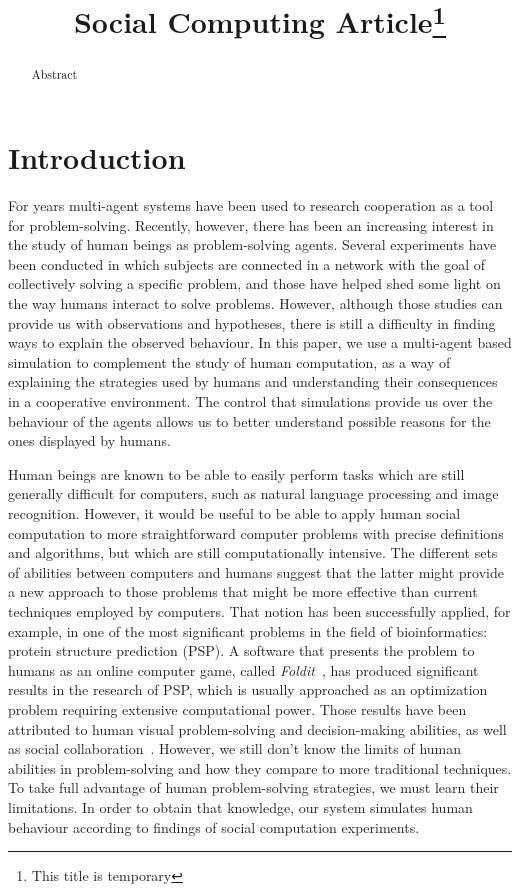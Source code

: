\documentclass[letterpaper]{article}
\title{Social Computing Article\thanks{This title is temporary}}
\begin{document}
\maketitle

\begin{abstract}
  Abstract
\end{abstract}

\section{Introduction}

For years multi-agent systems have been used to research cooperation as a tool for problem-solving. Recently, however, there has been an increasing interest in the study of human beings as problem-solving agents. Several experiments have been conducted in which subjects are connected in a network with the goal of collectively solving a specific problem, and those have helped shed some light on the way humans interact to solve problems. However, although those studies can provide us with observations and hypotheses, there is still a difficulty in finding ways to explain the observed behaviour. In this paper, we use a multi-agent based simulation to complement the study of human computation, as a way of explaining the strategies used by humans and understanding their consequences in a cooperative environment. The control that simulations provide us over the behaviour of the agents allows us to better understand possible reasons for the ones displayed by humans.

Human beings are known to be able to easily perform tasks which are still generally difficult for computers, such as natural language processing and image recognition. However, it would be useful to be able to apply human social computation to more straightforward computer problems with precise definitions and algorithms, but which are still computationally intensive. The different sets of abilities between computers and humans suggest that the latter might provide a new approach to those problems that might be more effective than current techniques employed by computers. That notion has been successfully applied, for example, in one of the most significant problems in the field of bioinformatics: protein structure prediction (PSP). A software that presents the problem to humans as an online computer game, called \emph{Foldit}~\cite{cooper:foldit}, has produced significant results in the research of PSP, which is usually approached as an optimization problem requiring extensive computational power. Those results have been attributed to human visual problem-solving and decision-making abilities, as well as social collaboration~\cite{cooper:foldit}. However, we still don't know the limits of human abilities in problem-solving and how they compare to more traditional techniques. To take full advantage of human problem-solving strategies, we must learn their limitations. In order to obtain that knowledge, our system simulates human behaviour according to findings of social computation experiments.
\end{document}
